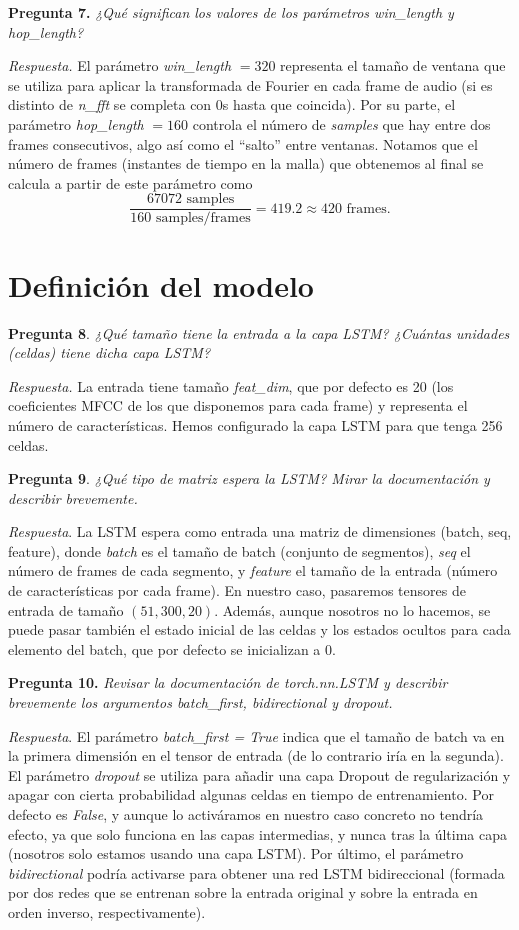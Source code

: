 \documentclass[11pt]{article}
\begin{document}
\textbf{Pregunta 7.} \textit{¿Qué significan los valores de los parámetros win\_length y hop\_length?}

\textit{Respuesta.} El parámetro \textit{win\_length} $=320$ representa el tamaño de ventana que se utiliza para aplicar la transformada de Fourier en cada frame de audio (si es distinto de \textit{n\_fft} se completa con 0s hasta que coincida). Por su parte, el parámetro \textit{hop\_length} $=160$ controla el número de \textit{samples} que hay entre dos frames consecutivos, algo así como el ``salto'' entre ventanas. Notamos que el número de frames (instantes de tiempo en la malla) que obtenemos al final se calcula a partir de este parámetro como
\[
\frac{67072 \text{ samples}}{160 \text{ samples/frames}} = 419.2 \approx 420 \text{ frames}.
\]

\section{Definición del modelo}

\textbf{Pregunta 8}. \textit{¿Qué tamaño tiene la entrada a la capa LSTM? ¿Cuántas unidades (celdas) tiene dicha capa LSTM?}

\textit{Respuesta.} La entrada tiene tamaño \textit{feat\_dim}, que por defecto es 20 (los coeficientes MFCC de los que disponemos para cada frame) y representa el número de características. Hemos configurado la capa LSTM para que tenga 256 celdas.

\textbf{Pregunta 9}. \textit{¿Qué tipo de matriz espera la LSTM? Mirar la documentación y describir brevemente.}

\textit{Respuesta}. La LSTM espera como entrada una matriz de dimensiones (batch, seq, feature), donde \textit{batch} es el tamaño de batch (conjunto de segmentos), \textit{seq} el número de frames de cada segmento, y \textit{feature} el tamaño de la entrada (número de características por cada frame). En nuestro caso, pasaremos tensores de entrada de tamaño $(51, 300, 20)$. Además, aunque nosotros no lo hacemos, se puede pasar también el estado inicial de las celdas y los estados ocultos para cada elemento del batch, que por defecto se inicializan a 0.

\textbf{Pregunta 10.} \textit{Revisar la documentación de torch.nn.LSTM y describir brevemente los argumentos batch\_first, bidirectional y dropout.}

\textit{Respuesta}. El parámetro \textit{batch\_first = True} indica que el tamaño de batch va en la primera dimensión en el tensor de entrada (de lo contrario iría en la segunda). El parámetro \textit{dropout} se utiliza para añadir una capa Dropout de regularización y apagar con cierta probabilidad algunas celdas en tiempo de entrenamiento. Por defecto es \textit{False}, y aunque lo activáramos en nuestro caso concreto no tendría efecto, ya que solo funciona en las capas intermedias, y nunca tras la última capa (nosotros solo estamos usando una capa LSTM). Por último, el parámetro \textit{bidirectional} podría activarse para obtener una red LSTM bidireccional (formada por dos redes que se entrenan sobre la entrada original y sobre la entrada en orden inverso, respectivamente).
\end{document}
